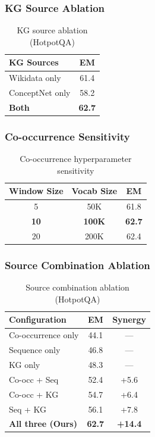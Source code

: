 \documentclass[10pt,twocolumn]{article}
\begin{document}
\subsubsection{KG Source Ablation}
\label{sec:kg_source_ablation}

\begin{table}[h]
\centering
\caption{KG source ablation (HotpotQA)}
\label{tab:kg_source}
\small
\begin{tabular}{@{}lc@{}}
\toprule
\textbf{KG Sources} & \textbf{EM} \\
\midrule
Wikidata only & 61.4 \\
ConceptNet only & 58.2 \\
\textbf{Both} & \textbf{62.7} \\
\bottomrule
\end{tabular}
\end{table}

\subsubsection{Co-occurrence Sensitivity}
\label{sec:cooc_sensitivity}

\begin{table}[h]
\centering
\caption{Co-occurrence hyperparameter sensitivity}
\label{tab:cooc_sensitivity}
\small
\begin{tabular}{@{}ccc@{}}
\toprule
\textbf{Window Size} & \textbf{Vocab Size} & \textbf{EM} \\
\midrule
5 & 50K & 61.8 \\
\textbf{10} & \textbf{100K} & \textbf{62.7} \\
20 & 200K & 62.4 \\
\bottomrule
\end{tabular}
\end{table}


\subsubsection{Source Combination Ablation}

\begin{table}[h]
\centering
\caption{Source combination ablation (HotpotQA)}
\label{tab:source_ablation}
\small
\begin{tabular}{@{}lcc@{}}
\toprule
\textbf{Configuration} & \textbf{EM} & \textbf{Synergy} \\
\midrule
Co-occurrence only & 44.1 & --- \\
Sequence only & 46.8 & --- \\
KG only & 48.3 & --- \\
\midrule
Co-occ + Seq & 52.4 & +5.6 \\
Co-occ + KG & 54.7 & +6.4 \\
Seq + KG & 56.1 & +7.8 \\
\midrule
\textbf{All three (Ours)} & \textbf{62.7} & \textbf{+14.4} \\
\bottomrule
\end{tabular}
\end{table}
\end{document}
